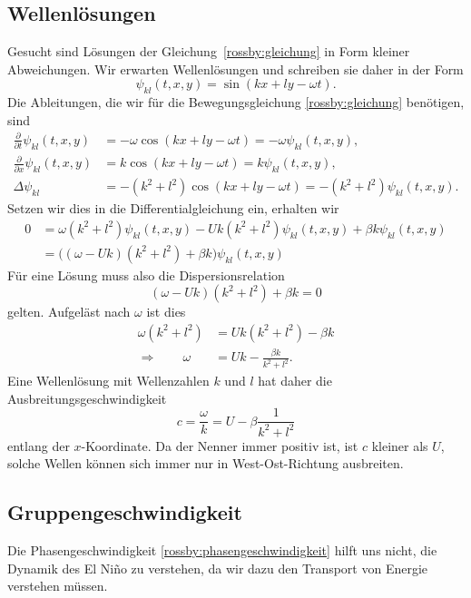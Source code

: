 \subsection{Wellenlösungen\label{subsection:rossby:loesungen}}
Gesucht sind Lösungen der Gleichung~\eqref{rossby:gleichung}
in Form kleiner Abweichungen.
Wir erwarten Wellenlösungen und schreiben sie daher in der Form
\[
\psi_{kl}(t,x,y)
=
\sin(kx+ly-\omega t).
\]
Die Ableitungen, die wir für die Bewegungsgleichung
\eqref{rossby:gleichung} benötigen, sind
\begin{align*}
\frac{\partial}{\partial t} \psi_{kl}(t,x,y)
&=
-\omega \cos(kx+ly-\omega t) = -\omega\psi_{kl}(t,x,y),
\\
\frac{\partial}{\partial x} \psi_{kl}(t,x,y)
&=
k
\cos(kx+ly-\omega t) = k \psi_{kl}(t,x,y),
\\
\Delta\psi_{kl}
&=
-(k^2+l^2)\cos(kx+ly-\omega t)=-(k^2+l^2)\psi_{kl}(t,x,y).
\end{align*}
Setzen wir dies in die Differentialgleichung ein, erhalten wir 
\begin{align*}
0
&=
\omega(k^2+l^2)\psi_{kl}(t,x,y)
-
Uk(k^2+l^2)\psi_{kl}(t,x,y)
+
\beta k\psi_{kl}(t,x,y)
\\
&=
\bigl((\omega-Uk)(k^2+l^2)+\beta k\bigr)\psi_{kl}(t,x,y)
\end{align*}
Für eine Lösung muss also die Dispersionsrelation
\[
(\omega -Uk)(k^2+l^2) +\beta k=0
\]
gelten.
Aufgeläst nach $\omega$ ist dies
\begin{align*}
\omega(k^2+l^2)
&=
Uk(k^2+l^2) -\beta k
\\
\Rightarrow\qquad
\omega
&=
Uk
-
\frac{\beta k}{k^2+l^2}.
\end{align*}
Eine Wellenlösung mit Wellenzahlen $k$ und $l$ hat daher 
die Ausbreitungsgeschwindigkeit 
\begin{equation}
c=\frac{\omega}{k} = U-\beta\frac{1}{k^2+l^2}
\label{rossby:phasengeschwindigkeit}
\end{equation}
entlang der $x$-Koordinate.
Da der Nenner immer positiv ist, ist $c$ kleiner als $U$, solche
Wellen können sich immer nur in West-Ost-Richtung ausbreiten.

\subsection{Gruppengeschwindigkeit}
Die Phasengeschwindigkeit 
\eqref{rossby:phasengeschwindigkeit}
hilft uns nicht, die Dynamik des El Niño zu verstehen, da wir dazu
den Transport von Energie verstehen müssen.








